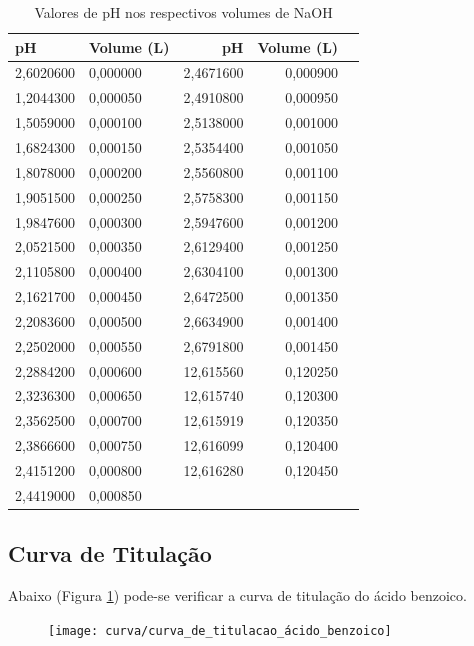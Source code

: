 \documentclass[a4paper, 12pt]{article}
\begin{document}
\begin{table}[H]
	\begin{center}
		\caption{Valores de pH nos respectivos volumes de NaOH}
		\label{dados_ac_benzoico}
		\begin{tabular}{lp{5cm}|rrp{5cm}}\toprule
			\textbf{pH} & \textbf{Volume (L)} & \textbf{pH} & \textbf{Volume (L)} \\ \midrule
			2,6020600 & 0,000000 & 2,4671600 & 0,000900 \\
			1,2044300 & 0,000050 & 2,4910800 & 0,000950 \\
			1,5059000 & 0,000100 & 2,5138000 & 0,001000 \\
			1,6824300 & 0,000150 & 2,5354400 & 0,001050 \\
			1,8078000 & 0,000200 & 2,5560800 & 0,001100 \\
			1,9051500 & 0,000250 & 2,5758300 & 0,001150 \\
			1,9847600 & 0,000300 & 2,5947600 & 0,001200 \\
			2,0521500 & 0,000350 & 2,6129400 & 0,001250 \\
			2,1105800 & 0,000400 & 2,6304100 & 0,001300 \\
			2,1621700 & 0,000450 & 2,6472500 & 0,001350 \\
			2,2083600 & 0,000500 & 2,6634900 & 0,001400 \\
			2,2502000 & 0,000550 & 2,6791800 & 0,001450 \\
			2,2884200 & 0,000600 & 12,615560 & 0,120250 \\
			2,3236300 & 0,000650 & 12,615740 & 0,120300 \\
			2,3562500 & 0,000700 & 12,615919 & 0,120350 \\
			2,3866600 & 0,000750 & 12,616099 & 0,120400 \\
			2,4151200 & 0,000800 & 12,616280 & 0,120450 \\
			2,4419000 & 0,000850 \\			
			\bottomrule
		\end{tabular}
	\end{center}
\end{table}

\subsection{Curva de Titulação}
Abaixo (Figura \ref{fig:curva_de_titulacao_ácido_benzoico}) pode-se verificar a curva de titulação do ácido benzoico.

\begin{figure}[H]
	\centering
	\texttt{[image: curva/curva\_de\_titulacao\_ácido\_benzoico]}
	\caption[Curva de Titulação Ácido Benzoico]{}
	\label{fig:curva_de_titulacao_ácido_benzoico}
\end{figure}
\end{document}
